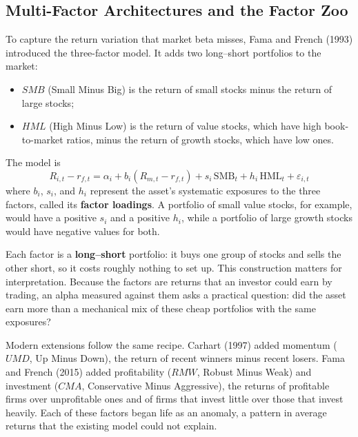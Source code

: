 \subsection{Multi-Factor Architectures and the Factor Zoo}
\label{sec:03-factors}
To capture the return variation that market beta misses, Fama and French (1993) introduced the three-factor model. It adds two long--short portfolios to the market:
\begin{itemize}
  \item $SMB$ (Small Minus Big) is the return of small stocks minus the return of large stocks;
  \item $HML$ (High Minus Low) is the return of value stocks, which have high book-to-market ratios, minus the return of growth stocks, which have low ones.
\end{itemize}
The model is
\begin{equation}
  R_{i,t} - r_{f,t} = \alpha_i + b_i (R_{m,t} - r_{f,t}) + s_i \,\mathrm{SMB}_t + h_i \,\mathrm{HML}_t + \varepsilon_{i,t}
  \label{eq:03-ff3}
\end{equation}
where $b_i$, $s_i$, and $h_i$ represent the asset's systematic exposures to the three factors, called its \textbf{factor loadings}. A portfolio of small value stocks, for example, would have a positive $s_i$ and a positive $h_i$, while a portfolio of large growth stocks would have negative values for both.

Each factor is a \textbf{long--short} portfolio: it buys one group of stocks and sells the other short, so it costs roughly nothing to set up. This construction matters for interpretation. Because the factors are returns that an investor could earn by trading, an alpha measured against them asks a practical question: did the asset earn more than a mechanical mix of these cheap portfolios with the same exposures?

Modern extensions follow the same recipe. Carhart (1997) added momentum ($UMD$, Up Minus Down), the return of recent winners minus recent losers. Fama and French (2015) added profitability ($RMW$, Robust Minus Weak) and investment ($CMA$, Conservative Minus Aggressive), the returns of profitable firms over unprofitable ones and of firms that invest little over those that invest heavily. Each of these factors began life as an anomaly, a pattern in average returns that the existing model could not explain.


